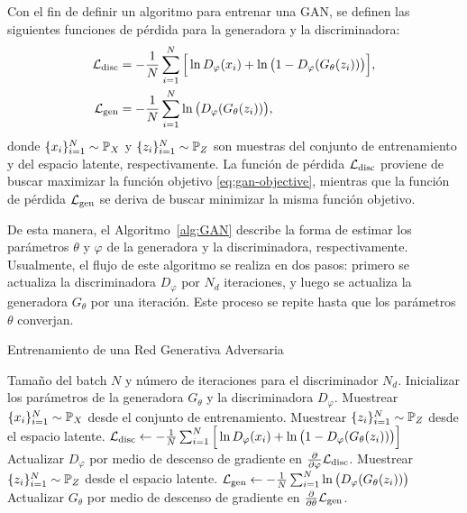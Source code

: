 
Con el fin de definir un algoritmo para entrenar una GAN, se definen las siguientes funciones de pérdida para la generadora y la discriminadora:
\begin{align}
    \cL_{\mathrm{disc}} & = -\frac{1}{N}\sum_{i=1}^{N} \Big[ \ln D_\varphi(x_i) + \ln \qty\big(1 - D_\varphi(G_\theta(z_i))) \Big], \\
    \cL_{\mathrm{gen}}  & = - \frac{1}{N}\sum_{i=1}^{N} \ln \qty\big(D_\varphi(G_\theta(z_i))),
\end{align}
donde $\{x_i\}_{i=1}^{N} \sim \Prob_X$ y $\{z_i\}_{i=1}^{N} \sim \Prob_Z$ son muestras del conjunto de entrenamiento y del espacio latente, respectivamente. La función de pérdida $\mathcal{L}_{\mathrm{disc}}$ proviene de buscar maximizar la función objetivo \eqref{eq:gan-objective}, mientras que la función de pérdida $\mathcal{L}_{\mathrm{gen}}$ se deriva de buscar minimizar la misma función objetivo.

De esta manera, el Algoritmo~\ref*{alg:GAN} describe la forma de estimar los parámetros $\theta$ y $\varphi$ de la generadora y la discriminadora, respectivamente. Usualmente, el flujo de este algoritmo se realiza en dos pasos: primero se actualiza la discriminadora $D_\varphi$ por $N_d$ iteraciones, y luego se actualiza la generadora $G_\theta$ por una iteración. Este proceso se repite hasta que los parámetros $\theta$ converjan.

\begin{algorithm}[H]

    \caption{Entrenamiento de una Red Generativa Adversaria \cite{goodfellow2014generative}}\label{alg:GAN}

    \begin{algorithmic}[1]
        \Require Tamaño del batch $N$ y número de iteraciones para el discriminador $N_d$.
        \State Inicializar los parámetros de la generadora $G_\theta$ y la discriminadora $D_\varphi$.
        \State Muestrear $\{x_i\}_{i=1}^{N} \sim \Prob_X$ desde el conjunto de entrenamiento.
        \State Muestrear $\{z_i\}_{i=1}^{N} \sim \Prob_Z$ desde el espacio latente.
        \State $\cL_{\mathrm{disc}} \gets -\frac{1}{N}\sum_{i=1}^{N} \Big[ \ln D_\varphi(x_i) + \ln \qty\big(1 - D_\varphi(G_\theta(z_i))) \Big]$
        \State Actualizar $D_\varphi$ por medio de descenso de gradiente en $\pdv{\varphi} \cL_{\mathrm{disc}}$.
        \EndFor
        \State Muestrear $\{z_i\}_{i=1}^{N} \sim \Prob_Z$ desde el espacio latente.
        \State $\cL_{\mathrm{gen}} \gets - \frac{1}{N}\sum_{i=1}^{N} \ln \qty\big(D_\varphi(G_\theta(z_i)))$
        \State Actualizar $G_\theta$ por medio de descenso de gradiente en $\pdv{\theta} \mathcal{L}_{\mathrm{gen}}$.
        \EndWhile
    \end{algorithmic}
\end{algorithm}

